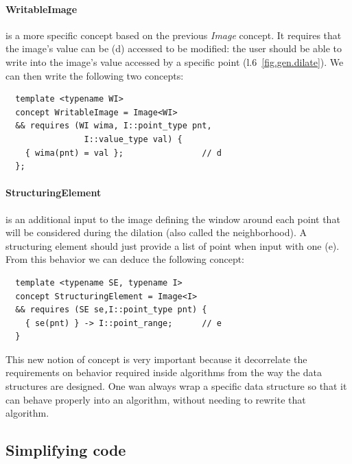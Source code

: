 \paragraph{WritableImage} is a more specific concept based on the previous \emph{Image} concept. It requires that the
image's value can be (d) accessed to be modified: the user should be able to write into the image's value accessed by a
specific point (l.6~\ref{fig.gen.dilate}). We can then write the following two concepts:
\begin{verbatim}
  template <typename WI>
  concept WritableImage = Image<WI>
  && requires (WI wima, I::point_type pnt,
                I::value_type val) {
    { wima(pnt) = val };                // d
  };
\end{verbatim}

\paragraph{StructuringElement} is an additional input to the image defining the window around each point that will be
considered during the dilation (also called the neighborhood). A structuring element should just provide a list of point
when input with one (e). From this behavior we can deduce the following concept:
\begin{verbatim}
  template <typename SE, typename I>
  concept StructuringElement = Image<I>
  && requires (SE se,I::point_type pnt) {
    { se(pnt) } -> I::point_range;      // e
  }
\end{verbatim}

This new notion of concept is very important because it decorrelate the requirements on behavior required inside
algorithms from the way the data structures are designed. One wan always wrap a specific data structure so that it can
behave properly into an algorithm, without needing to rewrite that algorithm.

\subsection{Simplifying code}
\label{genericity.postcpp11.subsec.simplifying}

